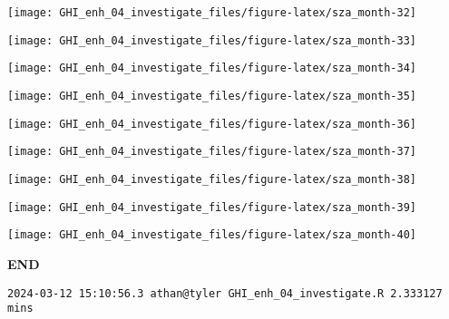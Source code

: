 \documentclass[
  10pt,
  a4paper,oneside]{article}
\begin{document}
\begin{center}\texttt{[image: GHI\_enh\_04\_investigate\_files/figure-latex/sza\_month-32]} \end{center}

\begin{center}\texttt{[image: GHI\_enh\_04\_investigate\_files/figure-latex/sza\_month-33]} \end{center}

\begin{center}\texttt{[image: GHI\_enh\_04\_investigate\_files/figure-latex/sza\_month-34]} \end{center}

\begin{center}\texttt{[image: GHI\_enh\_04\_investigate\_files/figure-latex/sza\_month-35]} \end{center}

\begin{center}\texttt{[image: GHI\_enh\_04\_investigate\_files/figure-latex/sza\_month-36]} \end{center}

\begin{center}\texttt{[image: GHI\_enh\_04\_investigate\_files/figure-latex/sza\_month-37]} \end{center}

\begin{center}\texttt{[image: GHI\_enh\_04\_investigate\_files/figure-latex/sza\_month-38]} \end{center}

\begin{center}\texttt{[image: GHI\_enh\_04\_investigate\_files/figure-latex/sza\_month-39]} \end{center}

\begin{center}\texttt{[image: GHI\_enh\_04\_investigate\_files/figure-latex/sza\_month-40]} \end{center}

\textbf{END}

\begin{verbatim}
2024-03-12 15:10:56.3 athan@tyler GHI_enh_04_investigate.R 2.333127 mins
\end{verbatim}
\end{document}
